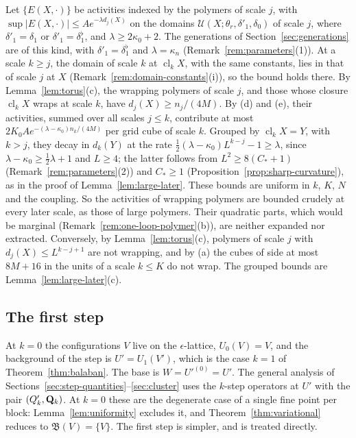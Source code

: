 Let $\{E(X,\cdot)\}$ be activities indexed by the polymers of scale $j$, with $\sup|E(X,\cdot)|\le Ae^{-\lambda d_j(X)}$ on the domains $\mathcal U(X;\theta_r,\delta'_1,\delta_0)$ of scale $j$, where $\delta'_1=\delta_1$ or $\delta'_1=\delta_1^\flat$, and $\lambda\ge2\kappa_0+2$. The generations of Section~\ref{sec:generations} are of this kind, with $\delta'_1=\delta_1^\flat$ and $\lambda=\kappa_n$ (Remark~\ref{rem:parameters}(1)). At a scale $k\ge j$, the domain of scale $k$ at $\operatorname{cl}_kX$, with the same constants, lies in that of scale $j$ at $X$ (Remark~\ref{rem:domain-constants}(i)), so the bound holds there. By Lemma~\ref{lem:torus}(c), the wrapping polymers of scale $j$, and those whose closure $\operatorname{cl}_kX$ wraps at scale $k$, have $d_j(X)\ge n_j/(4M)$. By (d) and (e), their activities, summed over all scales $j\le k$, contribute at most $2K_0Ae^{-(\lambda-\kappa_0)n_k/(4M)}$ per grid cube of scale $k$. Grouped by $\operatorname{cl}_kX=Y$, with $k>j$, they decay in $d_k(Y)$ at the rate $\frac12(\lambda-\kappa_0)L^{k-j}-1\ge\lambda$, since $\lambda-\kappa_0\ge\frac12\lambda+1$ and $L\ge4$; the latter follows from $L^2\ge8(C_*+1)$ (Remark~\ref{rem:parameters}(2)) and $C_*\ge1$ (Proposition~\ref{prop:sharp-curvature}), as in the proof of Lemma~\ref{lem:large-later}. These bounds are uniform in $k$, $K$, $N$ and the coupling. So the activities of wrapping polymers are bounded crudely at every later scale, as those of large polymers. Their quadratic parts, which would be marginal (Remark~\ref{rem:one-loop-polymer}(b)), are neither expanded nor extracted. Conversely, by Lemma~\ref{lem:torus}(c), polymers of scale $j$ with $d_j(X)\le L^{k-j+1}$ are not wrapping, and by (a) the cubes of side at most $8M+16$ in the units of a scale $k\le K$ do not wrap. The grouped bounds are Lemma~\ref{lem:large-later}(c).

\subsection{The first step}\label{subsec:tf-first}

At $k=0$ the configurations $V$ live on the $\epsilon$-lattice, $U_0(V)=V$, and the background of the step is $U'=U_1(V')$, which is the case $k=1$ of Theorem~\ref{thm:balaban}. The base is $W=U'^{(0)}=U'$. The general analysis of Sections~\ref{sec:step-quantities}--\ref{sec:cluster} uses the $k$-step operators at $U'$ with the pair $(Q'_k,\mathbf Q_k)$. At $k=0$ these are the degenerate case of a single fine point per block: Lemma~\ref{lem:uniformity} excludes it, and Theorem~\ref{thm:variational} reduces to $\mathfrak B(V)=\{V\}$. The first step is simpler, and is treated directly.

